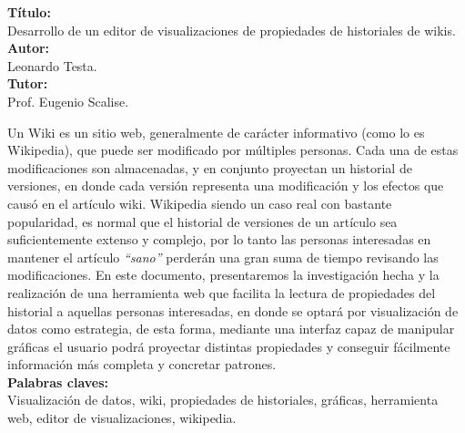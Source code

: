 \textbf{Título:}\\
Desarrollo de un editor de visualizaciones de propiedades de historiales de wikis.\\

\textbf{Autor:}\\
Leonardo Testa.\\

\textbf{Tutor:}\\
Prof. Eugenio Scalise.


Un Wiki es un sitio web, generalmente de carácter informativo (como lo es Wikipedia), que puede ser modificado por múltiples personas. Cada una de estas modificaciones son almacenadas, y en conjunto proyectan un historial de versiones, en donde cada versión representa una modificación y los efectos que causó en el artículo wiki.
Wikipedia siendo un caso real con bastante popularidad, es normal que el historial de versiones de un artículo sea suficientemente extenso y complejo, por lo tanto las personas interesadas en mantener el artículo \textit{“sano”} perderán una gran suma de tiempo revisando las modificaciones.
En este documento, presentaremos la investigación hecha y la realización de una herramienta web que facilita la lectura de propiedades del historial a aquellas personas interesadas, en donde se optará por visualización de datos como estrategia, de esta forma, mediante una interfaz capaz de manipular gráficas el usuario podrá proyectar distintas propiedades y conseguir fácilmente información más completa y concretar patrones.
\\

\textbf{Palabras claves:}\\
Visualización de datos, wiki, propiedades de historiales, gráficas, herramienta web, editor de visualizaciones, wikipedia.
